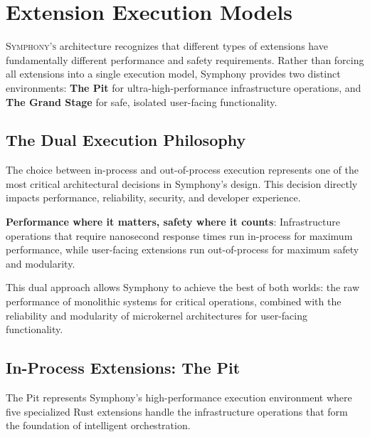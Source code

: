 
\section{Extension Execution Models}
\label{sec:extension-execution-models}

\lettrine{S}{ymphony's} architecture recognizes that different types of extensions have fundamentally different performance and safety requirements. Rather than forcing all extensions into a single execution model, Symphony provides two distinct environments: \textbf{The Pit} for ultra-high-performance infrastructure operations, and \textbf{The Grand Stage} for safe, isolated user-facing functionality.

\subsection{The Dual Execution Philosophy}
\label{subsec:dual-execution-philosophy}

The choice between in-process and out-of-process execution represents one of the most critical architectural decisions in Symphony's design. This decision directly impacts performance, reliability, security, and developer experience.

\begin{infobox}[title=Execution Model Philosophy]
\textbf{Performance where it matters, safety where it counts}: Infrastructure operations that require nanosecond response times run in-process for maximum performance, while user-facing extensions run out-of-process for maximum safety and modularity.
\end{infobox}

This dual approach allows Symphony to achieve the best of both worlds: the raw performance of monolithic systems for critical operations, combined with the reliability and modularity of microkernel architectures for user-facing functionality.

\subsection{In-Process Extensions: The Pit}
\label{subsec:in-process-extensions-pit}

The Pit represents Symphony's high-performance execution environment where five specialized Rust extensions handle the infrastructure operations that form the foundation of intelligent orchestration.

